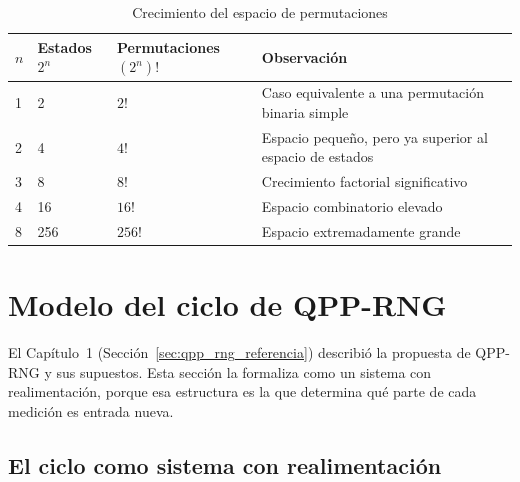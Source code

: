 \begin{table}[H]
\centering
\caption{Crecimiento del espacio de permutaciones}
\label{tab:crecimiento_qpp}
\begin{tabularx}{\textwidth}{@{}p{}p{}p{}X@{}}
\toprule
\textbf{$n$} & \textbf{Estados $2^n$} & \textbf{Permutaciones $(2^n)!$} & \textbf{Observación} \\
\midrule
1 & 2 & $2!$ & Caso equivalente a una permutación binaria simple \\
2 & 4 & $4!$ & Espacio pequeño, pero ya superior al espacio de estados \\
3 & 8 & $8!$ & Crecimiento factorial significativo \\
4 & 16 & $16!$ & Espacio combinatorio elevado \\
8 & 256 & $256!$ & Espacio extremadamente grande \\
\bottomrule
\end{tabularx}
\end{table}

\section{Modelo del ciclo de QPP-RNG}
\label{sec:qpp_rng}

El Capítulo~1 (Sección~\ref{sec:qpp_rng_referencia}) describió la propuesta de QPP-RNG y sus supuestos. Esta sección la formaliza como un sistema con realimentación, porque esa estructura es la que determina qué parte de cada medición es entrada nueva.

\subsection{El ciclo como sistema con realimentación}

